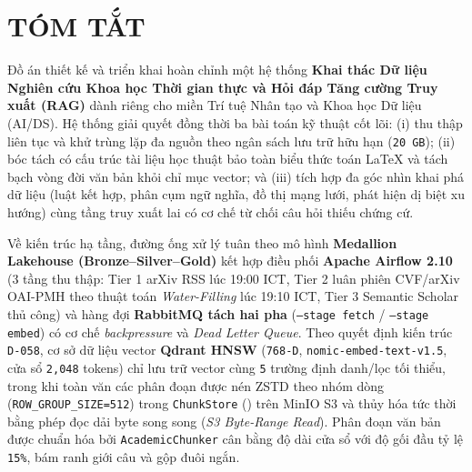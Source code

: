 \chapter*{TÓM TẮT}

Đồ án thiết kế và triển khai hoàn chỉnh một hệ thống \textbf{Khai thác Dữ liệu Nghiên cứu Khoa học Thời gian thực và Hỏi đáp Tăng cường Truy xuất (RAG)} dành riêng cho miền Trí tuệ Nhân tạo và Khoa học Dữ liệu (AI/DS). Hệ thống giải quyết đồng thời ba bài toán kỹ thuật cốt lõi: (i) thu thập liên tục và khử trùng lặp đa nguồn theo ngân sách lưu trữ hữu hạn (\texttt{20 GB}); (ii) bóc tách có cấu trúc tài liệu học thuật bảo toàn biểu thức toán LaTeX và tách bạch vòng đời văn bản khỏi chỉ mục vector; và (iii) tích hợp đa góc nhìn khai phá dữ liệu (luật kết hợp, phân cụm ngữ nghĩa, đồ thị mạng lưới, phát hiện dị biệt xu hướng) cùng tầng truy xuất lai có cơ chế từ chối câu hỏi thiếu chứng cứ.

Về kiến trúc hạ tầng, đường ống xử lý tuân theo mô hình \textbf{Medallion Lakehouse (Bronze--Silver--Gold)} kết hợp điều phối \textbf{Apache Airflow 2.10} (3 tầng thu thập: Tier 1 arXiv RSS lúc 19:00 ICT, Tier 2 luân phiên CVF/arXiv OAI-PMH theo thuật toán \textit{Water-Filling} lúc 19:10 ICT, Tier 3 Semantic Scholar thủ công) và hàng đợi \textbf{RabbitMQ tách hai pha} (\texttt{--stage fetch} / \texttt{--stage embed}) có cơ chế \textit{backpressure} và \textit{Dead Letter Queue}. Theo quyết định kiến trúc \texttt{D-058}, cơ sở dữ liệu vector \textbf{Qdrant HNSW} (\texttt{768-D}, \texttt{nomic-embed-text-v1.5}, cửa sổ \texttt{2,048} tokens) chỉ lưu trữ vector cùng \texttt{5} trường định danh/lọc tối thiểu, trong khi toàn văn các phân đoạn được nén ZSTD theo nhóm dòng (\texttt{ROW\_GROUP\_SIZE=512}) trong \texttt{ChunkStore} () trên MinIO S3 và thủy hóa tức thời bằng phép đọc dải byte song song (\textit{S3 Byte-Range Read}). Phân đoạn văn bản được chuẩn hóa bởi \texttt{AcademicChunker} cân bằng độ dài cửa sổ với độ gối đầu tỷ lệ \texttt{15\%}, bám ranh giới câu và gộp đuôi ngắn.

